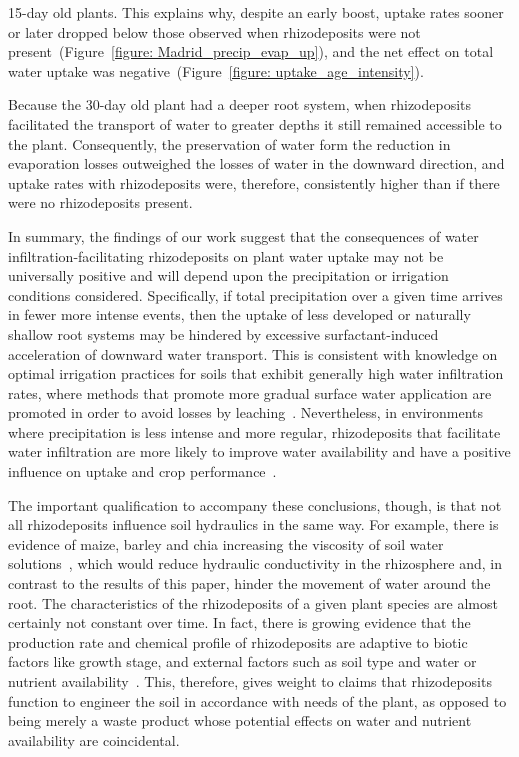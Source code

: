 \documentclass[11pt,a4paper]{article}
\numberwithin{equation}{section}
\begin{document}
15-day old plants. This explains why, despite an early boost, uptake rates sooner or later dropped below those observed when rhizodeposits were not present~(Figure~\ref{figure: Madrid_precip_evap_up}), and the net effect on total water uptake was negative~(Figure~\ref{figure: uptake_age_intensity}).

Because the 30-day old plant had a deeper root system, when rhizodeposits facilitated the transport of water to greater depths it still remained accessible to the plant. Consequently, the preservation of water form the reduction in evaporation losses outweighed the losses of water in the downward direction, and uptake rates with rhizodeposits were, therefore, consistently higher than if there were no rhizodeposits present.

In summary, the findings of our work suggest that the consequences of water infiltration-facilitating rhizodeposits on plant water uptake may not be universally positive and will depend upon the precipitation or irrigation conditions considered. Specifically, if total precipitation over a given time arrives in fewer more intense events, then the uptake of less developed or naturally shallow root systems may be hindered by excessive surfactant-induced acceleration of downward water transport. This is consistent with knowledge on optimal irrigation practices for soils that exhibit generally high water infiltration rates, where methods that promote more gradual surface water application are promoted in order to avoid losses by leaching~\citep{blackwell2000management, alhammadi2013irrigation}. Nevertheless, in environments where precipitation is less intense and more regular, rhizodeposits that facilitate water infiltration are more likely to improve water availability and have a positive influence on uptake and crop performance~\citep{oostindie2010influence, chaichi2015surfactant}.  

The important qualification to accompany these conclusions, though, is that not all rhizodeposits influence soil hydraulics in the same way. For example, there is evidence of maize, barley and chia increasing the viscosity of soil water solutions~\citep{naveed2019surface}, which would reduce hydraulic conductivity in the rhizosphere and, in contrast to the results of this paper, hinder the movement of water around the root. The characteristics of the rhizodeposits of a given plant species are almost certainly not constant over time. In fact, there is growing evidence that the production rate and chemical profile of rhizodeposits are adaptive to biotic factors like growth stage, and external factors such as soil type and water or nutrient availability~\citep{rolfe2019crying,wen2022linking,williams2020plant}. This, therefore, gives weight to claims that rhizodeposits function to engineer the soil in accordance with needs of the plant, as opposed to being merely a waste product whose potential effects on water and nutrient availability are coincidental.       
\end{document}
